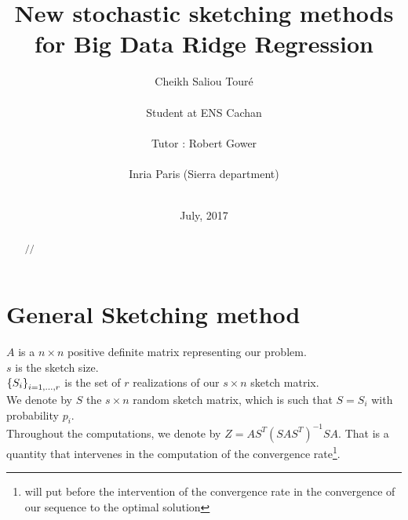 


\usepackage[colorinlistoftodos,bordercolor=orange,backgroundcolor=orange!20,linecolor=orange,textsize=scriptsize]{todonotes}
\newcommand{\rob}[1]{\todo[inline]{\textbf{Robert: }#1}}

\title{New stochastic sketching methods for Big Data Ridge Regression}
\author{Cheikh Saliou Tour\'e \\ \\
Student at ENS Cachan\\\\
Tutor : Robert Gower \\ \\
Inria Paris (Sierra department)\\\\ }




\date{July, 2017}




\renewcommand\bibname{References}
\maketitle


\begin{abstract}

//

\end{abstract}
\tableofcontents
\newpage

\chapter{General Sketching method}

$A$ is a $n \times n$ positive definite matrix representing our problem.\\ 
$s$ is the sketch size.\\
 $\left\{S_{i}\right\}_{i=1,\dots,r}$ is the set of $r$ realizations of our $s\times n$ sketch matrix.\\
We denote by $S$ the $s\times n$ random sketch matrix, which is such that $S = S_{i}$ with probability $p_{i}$. \\ 
 
Throughout the computations, we denote by $Z = A S^{T} (S A S^{T})^{-1} S A$. That is a quantity that intervenes in the computation of the convergence rate\footnote{will put before the intervention of the convergence rate in the convergence of our sequence to the optimal solution }.\\



